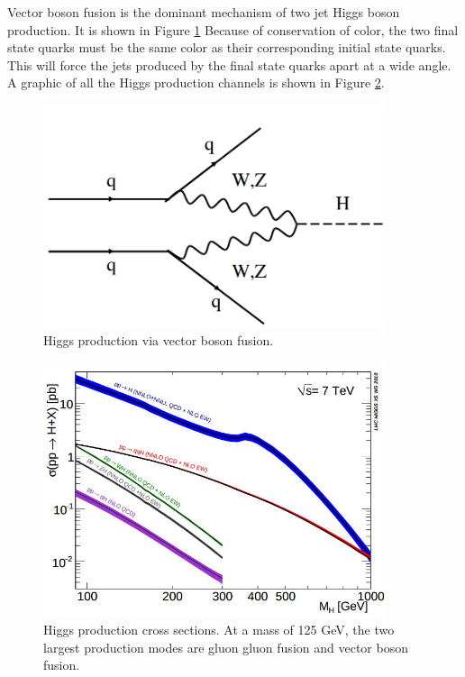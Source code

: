 \documentclass[oneside, letterpaper, oldfontcommands]{memoir}
\begin{document}
\qquad Vector boson fusion is the dominant mechanism of two jet Higgs boson production. It is shown in Figure \ref{fig:vbfHiggs} Because of conservation of color, the two final state quarks must be the same color as their corresponding initial state quarks. This will force the jets produced by the final state quarks apart at a wide angle. A graphic of all the Higgs production channels is shown in Figure \ref{fig:higgsproduction}\cite{Dittmaier:2011ti}.

\begin{figure}[here]
\includegraphics[width=0.9\textwidth]{vbfHiggs.png}
\caption{Higgs production via vector boson fusion.}
\label{fig:vbfHiggs}
\end{figure}

\begin{figure}[here]
\includegraphics[width=0.9\textwidth]{higgsproduction.jpg}
\caption{Higgs production cross sections\cite{Dittmaier:2011ti}. At a mass of 125 GeV, the two largest production modes are gluon gluon fusion and vector boson fusion.}
\label{fig:higgsproduction}
\end{figure}
\end{document}
